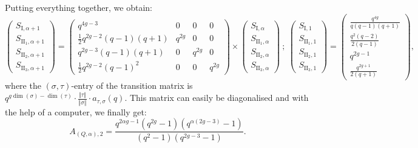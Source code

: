 \documentclass[11pt,english]{article}
\numberwithin{equation}{section}
\numberwithin{figure}{section}
\theoremstyle{definition}
\theoremstyle{plain}
\theoremstyle{remark}
\begin{document}
Putting everything together, we obtain:\[
\left(
\begin{array}{c}
S_{\mathrm{I},\alpha+1} \\
S_{\mathrm{II}_1,\alpha+1} \\
S_{\mathrm{II}_2,\alpha+1} \\
S_{\mathrm{II}_3,\alpha+1}
\end{array}
\right)
=
\left(
\begin{array}{cccc}
q^{4g-3} & 0 & 0 & 0 \\
\frac{1}{2}q^{2g-2}(q-1)(q+1) & q^{2g} & 0 & 0 \\
q^{2g-3}(q-1)(q+1) & 0 & q^{2g} & 0 \\
\frac{1}{2}q^{2g-2}(q-1)^2 & 0 & 0 & q^{2g}
\end{array}
\right)
\times
\left(
\begin{array}{c}
S_{\mathrm{I},\alpha} \\
S_{\mathrm{II}_1,\alpha} \\
S_{\mathrm{II}_2,\alpha} \\
S_{\mathrm{II}_3,\alpha}
\end{array}
\right)
\ ;\ 
\left(
\begin{array}{c}
S_{\mathrm{I},1} \\
S_{\mathrm{II}_1,1} \\
S_{\mathrm{II}_2,1} \\
S_{\mathrm{II}_3,1}
\end{array}
\right)
=
\left(
\begin{array}{c}
\frac{q^{4g}}{q(q-1)(q+1)} \\
\frac{q^2(q-2)}{2(q-1)} \\
q^{2g-1} \\
\frac{q^{2g+1}}{2(q+1)}
\end{array}
\right)
,
\] where the $(\sigma,\tau)$-entry of the transition matrix is $q^{g\dim(\sigma)-\dim(\tau)}\cdot\frac{\Vert\tau\Vert}{\Vert\sigma\Vert}\cdot a_{\tau,\sigma}(q)$.
This matrix can easily be diagonalised and with the help of a computer,
we finally get:\[
A_{(Q,\alpha),2}= \frac{q^{2\alpha g-1}(q^{2g}-1)(q^{\alpha(2g-3)}-1)}{(q^2-1)(q^{2g-3}-1)}.
\]
\end{document}
